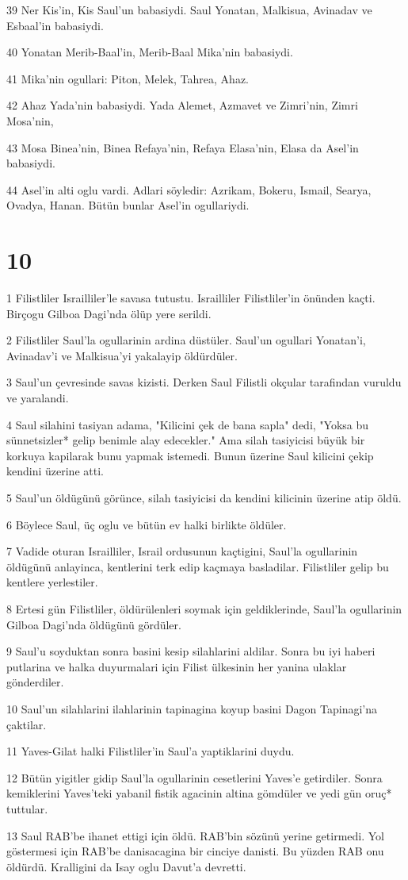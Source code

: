 \par 39 Ner Kis'in, Kis Saul'un babasiydi. Saul Yonatan, Malkisua, Avinadav ve Esbaal'in babasiydi.
\par 40 Yonatan Merib-Baal'in, Merib-Baal Mika'nin babasiydi.
\par 41 Mika'nin ogullari: Piton, Melek, Tahrea, Ahaz.
\par 42 Ahaz Yada'nin babasiydi. Yada Alemet, Azmavet ve Zimri'nin, Zimri Mosa'nin,
\par 43 Mosa Binea'nin, Binea Refaya'nin, Refaya Elasa'nin, Elasa da Asel'in babasiydi.
\par 44 Asel'in alti oglu vardi. Adlari söyledir: Azrikam, Bokeru, Ismail, Searya, Ovadya, Hanan. Bütün bunlar Asel'in ogullariydi.

\chapter{10}

\par 1 Filistliler Israilliler'le savasa tutustu. Israilliler Filistliler'in önünden kaçti. Birçogu Gilboa Dagi'nda ölüp yere serildi.
\par 2 Filistliler Saul'la ogullarinin ardina düstüler. Saul'un ogullari Yonatan'i, Avinadav'i ve Malkisua'yi yakalayip öldürdüler.
\par 3 Saul'un çevresinde savas kizisti. Derken Saul Filistli okçular tarafindan vuruldu ve yaralandi.
\par 4 Saul silahini tasiyan adama, "Kilicini çek de bana sapla" dedi, "Yoksa bu sünnetsizler* gelip benimle alay edecekler." Ama silah tasiyicisi büyük bir korkuya kapilarak bunu yapmak istemedi. Bunun üzerine Saul kilicini çekip kendini üzerine atti.
\par 5 Saul'un öldügünü görünce, silah tasiyicisi da kendini kilicinin üzerine atip öldü.
\par 6 Böylece Saul, üç oglu ve bütün ev halki birlikte öldüler.
\par 7 Vadide oturan Israilliler, Israil ordusunun kaçtigini, Saul'la ogullarinin öldügünü anlayinca, kentlerini terk edip kaçmaya basladilar. Filistliler gelip bu kentlere yerlestiler.
\par 8 Ertesi gün Filistliler, öldürülenleri soymak için geldiklerinde, Saul'la ogullarinin Gilboa Dagi'nda öldügünü gördüler.
\par 9 Saul'u soyduktan sonra basini kesip silahlarini aldilar. Sonra bu iyi haberi putlarina ve halka duyurmalari için Filist ülkesinin her yanina ulaklar gönderdiler.
\par 10 Saul'un silahlarini ilahlarinin tapinagina koyup basini Dagon Tapinagi'na çaktilar.
\par 11 Yaves-Gilat halki Filistliler'in Saul'a yaptiklarini duydu.
\par 12 Bütün yigitler gidip Saul'la ogullarinin cesetlerini Yaves'e getirdiler. Sonra kemiklerini Yaves'teki yabanil fistik agacinin altina gömdüler ve yedi gün oruç* tuttular.
\par 13 Saul RAB'be ihanet ettigi için öldü. RAB'bin sözünü yerine getirmedi. Yol göstermesi için RAB'be danisacagina bir cinciye danisti. Bu yüzden RAB onu öldürdü. Kralligini da Isay oglu Davut'a devretti.

